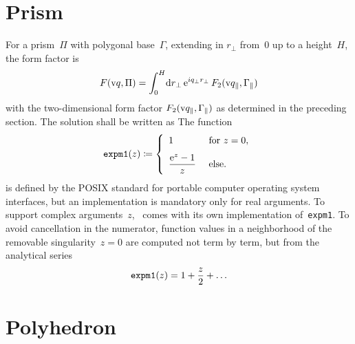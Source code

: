 %
%


\section{Prism}\label{SFFPrism}

%
%

For a prism~$\Pi$ with polygonal base~$\Gamma$,
extending in $r_\perp$ from~0 up to a height~$H$,
the form factor is
\begin{equation}
  F(\text{v}{q},\Pi)
  = \int_0^H\!\text{d} r_\perp\,\text{e}^{i q_\perp r_\perp}\,F_2(\text{v}{q}_\parallel,\Gamma_\parallel)
\end{equation}
with the two-dimensional form factor $F_2(\text{v}{q}_\parallel,\Gamma_\parallel)$ as determined in the preceding section.
The solution shall be written as
The function
\begin{equation}
  \text{\texttt{expm1}}(z) \coloneqq
  \left\{ \begin{array}{ll}
    1&\text{~for~}z=0,\\[1.8ex]
    \displaystyle \frac{\text{e}^{z}-1}{z}&\text{~else.}
    \end{array}\right.
\end{equation}
is defined by the POSIX standard for portable computer operating system interfaces,
but an implementation is mandatory only for real arguments.
To support complex arguments~$z$,
\BornAgain\ comes with its own implementation of~\texttt{expm1}.
To avoid cancellation in the numerator,
function values in a neighborhood of the removable singularity~$z=0$
are computed not term by term,
but from the analytical series
\begin{equation}
  \text{\texttt{expm1}}(z) = 1 + \frac{z}{2} + \ldots
\end{equation}

%
%

\section{Polyhedron}\label{SFFPolyhedron}

